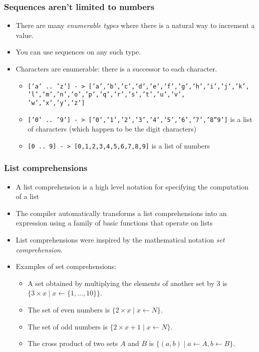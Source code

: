 \documentclass{beamer}
\begin{document}
\begin{frame}[fragile]
\frametitle{Sequences aren't limited to numbers}

\begin{itemize}
\item There are many \emph{enumerable types} where there is a natural
  way to increment a value.
\item You can use sequences on any such type.
\item Characters are enumerable: there is a successor to each
  character.
  \begin{itemize}
  \item \texttt{['a' .. 'z'] \-- > ['a','b','c','d','e','f','g','h','i','j','k',\\
  'l','m','n','o','p','q','r','s','t','u','v',\\
  'w','x','y','z']}
  \item \texttt{['0' .. '9'] \-- > ['0','1','2','3','4','5','6','7','8''9']} is a list of characters
    (which happen to be the digit characters)
  \item \texttt{[0 .. 9] \-- > [0,1,2,3,4,5,6,7,8,9]} is a list of numbers
  \end{itemize}
\end{itemize}

\end{frame}

\begin{frame}[fragile]
\frametitle{List comprehensions}

\begin{itemize}
\item A list comprehension is a high level notation for specifying
  the computation of a list
\item The compiler automatically transforms a list comprehensions
  into an expression using a family of basic functions that operate
  on lists
\item List comprehensions were inspired by the mathematical
  notation \emph{set comprehension}.
\item Examples of set comprehensions:
  \begin{itemize}
  \item A set obtained by multiplying the elements of another set
    by 3 is $\{3 \times x \;|\;x \leftarrow \{1, \ldots, 10\}\}$.
  \item The set of even numbers is $\{2 \times x \;|\; x
    \leftarrow N \}$.
  \item The set of odd numbers is $\{2 \times x + 1 \;|\; x
    \leftarrow N \}$.
  \item The cross product of two sets $A$ and $B$ is $\{(a,b) \;|\;a \leftarrow A, b \leftarrow B\}$.
  \end{itemize}
\end{itemize}

\end{frame}
\end{document}
